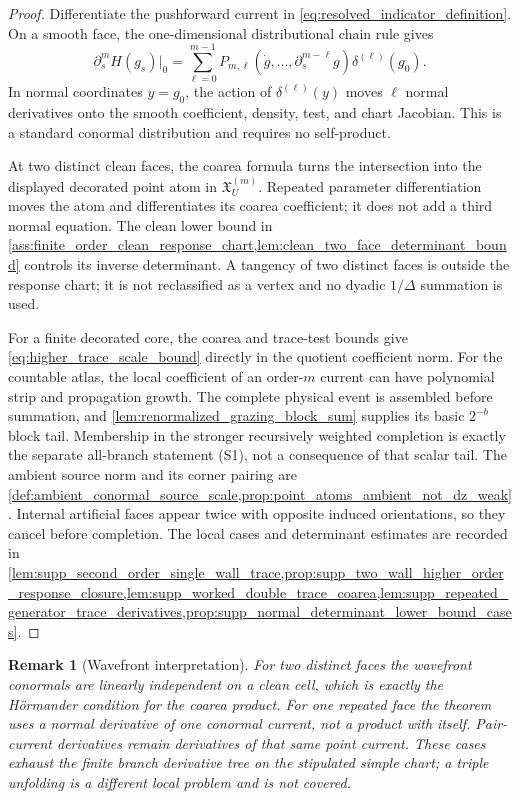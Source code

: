 \documentclass[11pt]{amsart}
\theoremstyle{compactplain}
\theoremstyle{compactdefinition}
\theoremstyle{compactremark}
\newtheorem*{remark*}{Remark}
\begin{document}
\begin{proof}
Differentiate the pushforward current in
\eqref{eq:resolved_indicator_definition}.  On a smooth face, the
one-dimensional distributional chain rule gives
\[
  \partial_s^mH(g_s)\big|_0
  =
  \sum_{\ell=0}^{m-1}
  P_{m,\ell}(\dot g,\ldots,\partial_s^{m-\ell}g)
  \delta^{(\ell)}(g_0).
\]
In normal coordinates \(y=g_0\), the action of
\(\delta^{(\ell)}(y)\) moves \(\ell\) normal derivatives onto the smooth
coefficient, density, test, and chart Jacobian.  This is a standard conormal
distribution and requires no self-product.

At two distinct clean faces, the coarea formula turns the intersection
into the displayed decorated point atom in
\(\mathfrak X_U^{(m)}\).  Repeated parameter differentiation moves the
atom and differentiates its coarea coefficient; it does not add a third
normal equation.  The clean lower bound in
\cref{ass:finite_order_clean_response_chart,lem:clean_two_face_determinant_bound}
controls its inverse determinant.  A tangency of two distinct faces is outside
the response chart; it is not reclassified as a vertex and no dyadic
\(1/\Delta\) summation is used.

For a finite decorated core, the coarea and trace-test bounds give
\eqref{eq:higher_trace_scale_bound} directly in the quotient coefficient
norm.  For the countable atlas, the local coefficient of an order-\(m\)
current can have polynomial strip and propagation growth.  The complete
physical event is assembled before summation, and
\cref{lem:renormalized_grazing_block_sum} supplies its basic
\(2^{-b}\) block tail.  Membership in the stronger recursively weighted
completion is exactly the separate all-branch statement (S1), not a
consequence of that scalar tail.  The ambient source norm and its corner
pairing are \cref{def:ambient_conormal_source_scale,prop:point_atoms_ambient_not_dz_weak}.
Internal artificial faces appear twice
with opposite induced orientations, so they cancel before completion.  The
local cases and determinant estimates are recorded in
\cref{lem:supp_second_order_single_wall_trace,prop:supp_two_wall_higher_order_response_closure,lem:supp_worked_double_trace_coarea,lem:supp_repeated_generator_trace_derivatives,prop:supp_normal_determinant_lower_bound_cases}.
\end{proof}

\begin{remark*}[Wavefront interpretation]
For two distinct faces the wavefront conormals are linearly independent on a
clean cell, which is exactly the Hörmander condition for the coarea product.
For one repeated face the theorem uses a normal derivative of one conormal
current, not a product with itself.  Pair-current derivatives remain
derivatives of that same point current.  These cases exhaust the finite branch
derivative tree on the stipulated simple chart; a triple unfolding is a
different local problem and is not covered.
\end{remark*}
\end{document}

